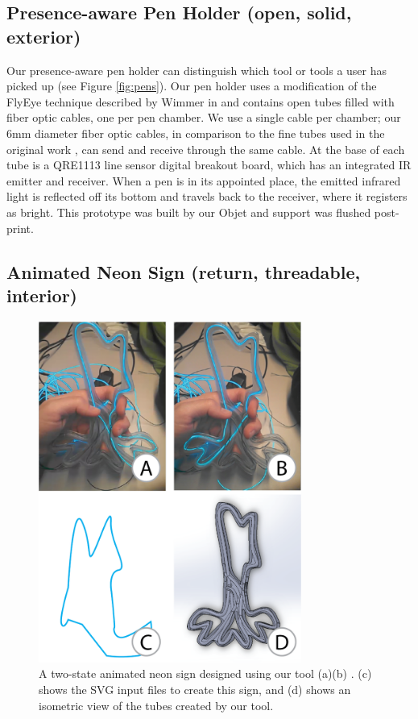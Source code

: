 \subsection{Presence-aware Pen Holder (open, solid, exterior)}

Our presence-aware pen holder can distinguish which tool or tools a user has picked up (see Figure \ref{fig:pens}).  Our pen holder uses a modification of the FlyEye technique described by Wimmer in \cite{Wimmer-flyeye} and contains open tubes filled with fiber optic cables, one per pen chamber.  We use a single cable per chamber; our 6mm diameter fiber optic cables, in comparison to the fine tubes used in the original work , can send and receive through the same cable.  At the base of each tube is a QRE1113 line sensor digital breakout board, which has an integrated IR emitter and receiver.   When a pen is in its appointed place, the emitted infrared light is reflected off its bottom and travels back to the receiver, where it registers as bright.  This prototype was built by our Objet and support was flushed post-print. 

\subsection{Animated Neon Sign (return, threadable, interior)}

\begin{figure}[h!]
\centering
    \includegraphics[width=3.4in]{figures/sign.png}
\caption{A two-state animated neon sign designed using our tool (a)(b) .  (c) shows the SVG input files to create this sign, and (d) shows an isometric view of the tubes created by our tool. }
\label{fig:neon}
\end{figure}

